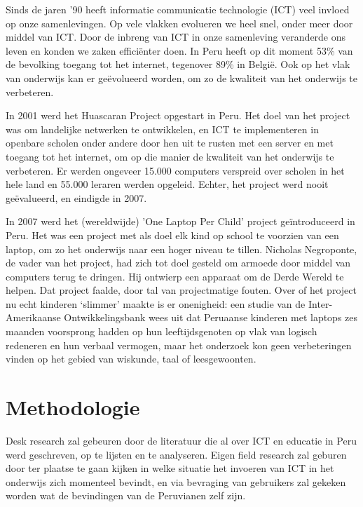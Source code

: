 Sinds de jaren ’90 heeft informatie communicatie technologie (ICT) veel invloed op onze samenlevingen. Op vele vlakken evolueren we heel snel, onder meer door middel van ICT. Door de inbreng van ICT in onze samenleving veranderde ons leven en konden we zaken efficiënter doen. In Peru heeft op dit moment 53\% van de bevolking toegang tot het internet, tegenover 89\% in België. \autocite{itu2018} Ook op het vlak van onderwijs kan er geëvolueerd worden, om zo de kwaliteit van het onderwijs te verbeteren.

In 2001 werd het Huascaran Project opgestart in Peru. Het doel van het project was om landelijke netwerken te ontwikkelen, en ICT te implementeren in openbare scholen onder andere door hen uit te rusten met een server en met toegang tot het internet, om op die manier de kwaliteit van het onderwijs te verbeteren. Er werden ongeveer 15.000 computers verspreid over scholen in het hele land en 55.000 leraren werden opgeleid. Echter, het project werd nooit geëvalueerd, en eindigde in 2007. \autocite{salas-pilco2014}

In 2007 werd het (wereldwijde) ’One Laptop Per Child’ project geïntroduceerd in Peru. Het was een project met als doel elk kind op school te voorzien van een laptop, om zo het onderwijs naar een hoger niveau te tillen. Nicholas Negroponte, de vader van het project, had zich tot doel gesteld om armoede door middel van computers terug te dringen. Hij ontwierp een apparaat om de Derde Wereld te helpen. Dat project faalde, door tal van projectmatige fouten. \autocite{Wooster2018} Over of het project nu echt kinderen ‘slimmer’ maakte is er onenigheid: een studie van de Inter-Amerikaanse Ontwikkelingsbank \autocite{Severin2012} wees uit dat Peruaanse kinderen met laptops zes maanden voorsprong hadden op hun leeftijdsgenoten op vlak van logisch redeneren en hun verbaal vermogen, maar het onderzoek kon geen verbeteringen vinden op het gebied van wiskunde, taal of leesgewoonten. \autocite{Murhpy2012}
 

\section{Methodologie}
\label{sec:methodologie}
Desk research zal gebeuren door de literatuur die al over ICT en educatie in Peru werd geschreven, op te lijsten en te analyseren. Eigen field research zal geburen door ter plaatse te gaan kijken in welke situatie het invoeren van ICT in het onderwijs zich momenteel bevindt, en via bevraging van gebruikers zal gekeken worden wat de bevindingen van de Peruvianen zelf zijn.
 

